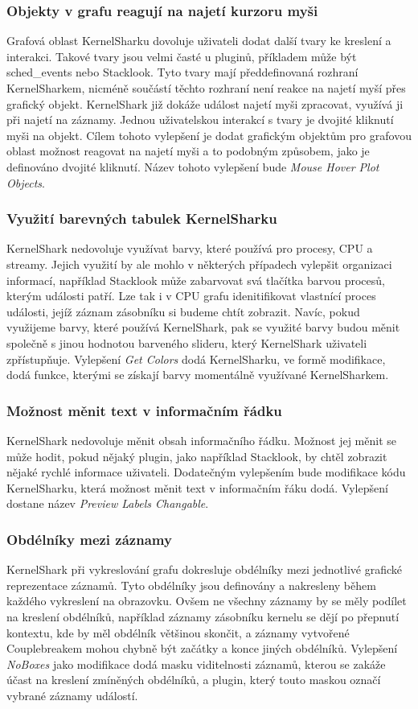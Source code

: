 \subsubsection*{Objekty v grafu reagují na najetí kurzoru myši}
Grafová oblast KernelSharku dovoluje uživateli dodat další tvary ke kreslení a interakci. Takové tvary jsou velmi časté u pluginů, příkladem může být sched\_events nebo Stacklook. Tyto tvary mají předdefinovaná rozhraní KernelSharkem, nicméně součástí těchto rozhraní není reakce na najetí myší přes grafický objekt. KernelShark již dokáže událost najetí myši zpracovat, využívá ji při najetí na záznamy. Jednou uživatelskou interakcí s tvary je dvojité kliknutí myši na objekt. Cílem tohoto vylepšení je dodat grafickým objektům pro grafovou oblast možnost reagovat na najetí myši a to podobným způsobem, jako je definováno dvojité kliknutí. Název tohoto vylepšení bude \emph{Mouse Hover Plot Objects}.

\subsubsection*{Využití barevných tabulek KernelSharku}
KernelShark nedovoluje využívat barvy, které používá pro procesy, CPU a streamy. Jejich využití by ale mohlo v některých případech vylepšit organizaci informací, například Stacklook může zabarvovat svá tlačítka barvou procesů, kterým události patří. Lze tak i v CPU grafu idenitifikovat vlastnící proces události, jejíž záznam zásobníku si budeme chtít zobrazit. Navíc, pokud využijeme barvy, které používá KernelShark, pak se využité barvy budou měnit společně s jinou hodnotou barveného slideru, který KernelShark uživateli zpřístupňuje. Vylepšení \emph{Get Colors} dodá KernelSharku, ve formě modifikace, dodá funkce, kterými se získají barvy momentálně využívané KernelSharkem.

\subsubsection*{Možnost měnit text v informačním řádku}
KernelShark nedovoluje měnit obsah informačního řádku. Možnost jej měnit se může hodit, pokud nějaký plugin, jako například Stacklook, by chtěl zobrazit nějaké rychlé informace uživateli. Dodatečným vylepšením bude modifikace kódu KernelSharku, která možnost měnit text v informačním řáku dodá. Vylepšení dostane název \emph{Preview Labels Changable}.

\subsubsection*{Obdélníky mezi záznamy}
KernelShark při vykreslování grafu dokresluje obdélníky mezi jednotlivé grafické reprezentace záznamů. Tyto obdélníky jsou definovány a nakresleny během každého vykreslení na obrazovku. Ovšem ne všechny záznamy by se měly podílet na kreslení obdélníků, například záznamy zásobníku kernelu se dějí po přepnutí kontextu, kde by měl obdélník většinou skončit, a záznamy vytvořené Couplebreakem mohou chybně být začátky a konce jiných obdélníků. Vylepšení \emph{NoBoxes} jako modifikace dodá masku viditelnosti záznamů, kterou se zakáže účast na kreslení zmíněných obdélníků, a plugin, který touto maskou označí vybrané záznamy událostí.

